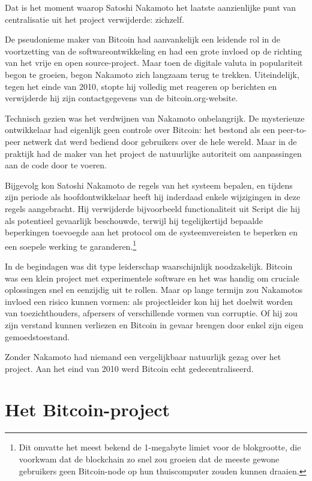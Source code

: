 \documentclass[smalldemyvopaper,11pt,twoside,onecolumn,openright,extrafontsizes,hidelinks]{memoir}
\begin{document}
Dat is het moment waarop Satoshi Nakamoto het laatste aanzienlijke punt
van centralisatie uit het project verwijderde: zichzelf.

De pseudonieme maker van Bitcoin had aanvankelijk een leidende rol in de
voortzetting van de softwareontwikkeling en had een grote invloed op de
richting van het vrije en open source-project. Maar toen de digitale
valuta in populariteit begon te groeien, begon Nakamoto zich langzaam
terug te trekken. Uiteindelijk, tegen het einde van 2010, stopte hij
volledig met reageren op berichten en verwijderde hij zijn
contactgegevens van de bitcoin.org-website.

Technisch gezien was het verdwijnen van Nakamoto onbelangrijk. De
mysterieuze ontwikkelaar had eigenlijk geen controle over Bitcoin: het
bestond als een peer-to-peer netwerk dat werd bediend door gebruikers
over de hele wereld. Maar in de praktijk had de maker van het project de
natuurlijke autoriteit om aanpassingen aan de code door te voeren.

Bijgevolg kon Satoshi Nakamoto de regels van het systeem bepalen, en
tijdens zijn periode als hoofdontwikkelaar heeft hij inderdaad enkele
wijzigingen in deze regels aangebracht. Hij verwijderde bijvoorbeeld
functionaliteit uit Script die hij als potentieel gevaarlijk beschouwde,
terwijl hij tegelijkertijd bepaalde beperkingen toevoegde aan het
protocol om de systeemvereisten te beperken en een soepele werking te
garanderen.\footnote{Dit omvatte het meest bekend de 1-megabyte limiet
  voor de blokgrootte, die voorkwam dat de blockchain zo snel zou
  groeien dat de meeste gewone gebruikers geen Bitcoin-node op hun
  thuiscomputer zouden kunnen draaien.}

In de begindagen was dit type leiderschap waarschijnlijk noodzakelijk.
Bitcoin was een klein project met experimentele software en het was
handig om cruciale oplossingen snel en eenzijdig uit te rollen. Maar op
lange termijn zou Nakamotos invloed een risico kunnen vormen: als
projectleider kon hij het doelwit worden van toezichthouders, afpersers
of verschillende vormen van corruptie. Of hij zou zijn verstand kunnen
verliezen en Bitcoin in gevaar brengen door enkel zijn eigen
gemoedstoestand.

Zonder Nakamoto had niemand een vergelijkbaar natuurlijk gezag over het
project. Aan het eind van 2010 werd Bitcoin echt gedecentraliseerd.

\section{Het Bitcoin-project}\label{het-bitcoin-project}
\end{document}
